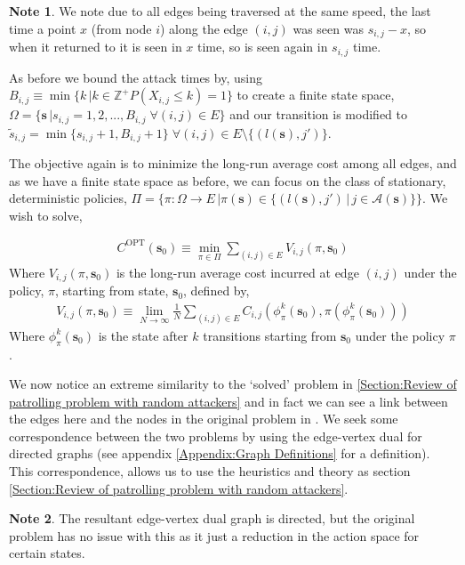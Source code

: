 \documentclass[a4paper,10pt]{article}
\theoremstyle{definition}
\theoremstyle{definition}
\theoremstyle{remark}
\theoremstyle{definition}
\newtheorem*{note}{Note}
\begin{document}
\begin{note}
We note due to all edges being traversed at the same speed, the last time a point $x$ (from node $i$) along the edge $(i,j)$ was seen was $s_{i,j}-x$, so when it returned to it is seen in $x$ time, so is seen again in $s_{i,j}$ time.
\end{note}

As before we bound the attack times by, using $B_{i,j} \equiv \min \{ k \, | k \in \mathbb{Z}^{+} P(X_{i,j} \leq k)=1 \}$ to create a finite state space, $\Omega= \{\bm{s} \, | s_{i,j}=1,2,...,B_{i,j} \; \forall (i,j) \in E \}$ and our transition is modified to $\widetilde{s}_{i,j}=\min\{s_{i,j}+1,B_{i,j}+1 \} \; \forall (i,j) \in E \setminus \{(l(\bm{s}),j') \}$.

The objective again is to minimize the long-run average cost among all edges, and as we have a finite state space as before, we can focus on the class of stationary, deterministic policies, $\Pi = \{ \pi: \Omega \rightarrow E \, | \pi(\bm{s}) \in  \{(l(\bm{s}),j') \, | \, j \in \mathcal{A}(\bm{s}) \} \}$. We wish to solve,

\begin{align*}
C^{\text{OPT}}(\bm{s}_{0}) \equiv \min\limits_{\pi \in \Pi} \sum\limits_{(i,j) \in E} V_{i,j}(\pi,\bm{s}_{0})
\end{align*}
Where $V_{i,j}(\pi,\bm{s}_{0})$ is the long-run average cost incurred at edge $(i,j)$ under the policy, $\pi$, starting from state, $\bm{s}_{0}$, defined by,
\begin{align*}
V_{i,j}(\pi,\bm{s}_{0}) \equiv \lim\limits_{N \rightarrow \infty} \frac{1}{N} \sum\limits_{(i,j) \in E} C_{i,j}(\phi^{k}_{\pi}(\bm{s}_{0}),\pi(\phi^{k}_{\pi}(\bm{s}_{0})))
\end{align*}
Where $\phi^{k}_{\pi}(\bm{s}_{0})$ is the state after $k$ transitions starting from $\bm{s}_{0}$ under the policy $\pi$.


We now notice an extreme similarity to the `solved' problem in \ref{Section:Review of patrolling problem with random attackers} and in fact we can see a link between the edges here and the nodes in the original problem in \cite{Lin2013}. We seek some correspondence between the two problems by using the edge-vertex dual for directed graphs (see appendix \ref{Appendix:Graph Definitions} for a definition). This correspondence, allows us to use the heuristics and theory as section \ref{Section:Review of patrolling problem with random attackers}.

\begin{note}
The resultant edge-vertex dual graph is directed, but the original problem has no issue with this as it just a reduction in the action space for certain states.
\end{note}
\end{document}
